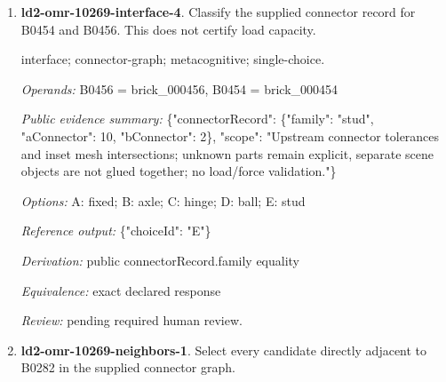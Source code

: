 \begin{enumerate}
\par{\small interface; connector-graph; metacognitive; single-choice.\par\textit{Operands:} B0383 = brick\_000383, B0384 = brick\_000384\par\textit{Public evidence summary:} \{"connectorRecord": \{"family": "hinge", "aConnector": 0, "bConnector": 1\}, "scope": "Upstream connector tolerances and inset mesh intersections; unknown parts remain explicit, separate scene objects are not glued together; no load/force validation."\}\par\textit{Options:} A: fixed; B: hinge; C: ball; D: stud; E: axle\par\textit{Reference output:} \{"choiceId": "B"\}\par\textit{Derivation:} public connectorRecord.family equality\par\textit{Equivalence:} exact declared response\par\textit{Review:} pending required human review.}
\item \textbf{ld2-omr-10269-interface-4}. Classify the supplied connector record for B0454 and B0456. This does not certify load capacity.
\par{\small interface; connector-graph; metacognitive; single-choice.\par\textit{Operands:} B0456 = brick\_000456, B0454 = brick\_000454\par\textit{Public evidence summary:} \{"connectorRecord": \{"family": "stud", "aConnector": 10, "bConnector": 2\}, "scope": "Upstream connector tolerances and inset mesh intersections; unknown parts remain explicit, separate scene objects are not glued together; no load/force validation."\}\par\textit{Options:} A: fixed; B: axle; C: hinge; D: ball; E: stud\par\textit{Reference output:} \{"choiceId": "E"\}\par\textit{Derivation:} public connectorRecord.family equality\par\textit{Equivalence:} exact declared response\par\textit{Review:} pending required human review.}
\item \textbf{ld2-omr-10269-neighbors-1}. Select every candidate directly adjacent to B0282 in the supplied connector graph.

\end{enumerate}
